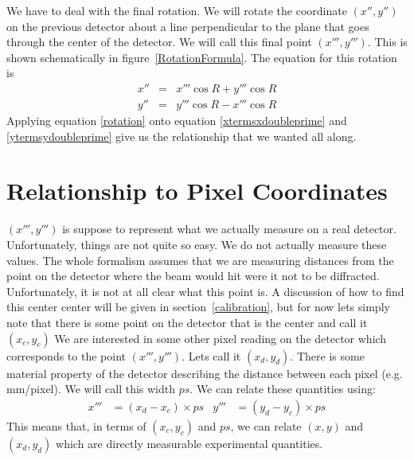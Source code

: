 \begin{SCfigure}[1][tb]
    \centering
    
    \caption{Here, we take a point on a plane rotated
    by angle $\beta$ about $\hat y$ and by angle
    $\alpha$ about $\hat x'$. We then rotated this point
    about a line normal to the plane going through the
    origin by angle $R$. Rotating the point is 
    equivalent to rotating the plane.}
    \label{RotationFormula}
\end{SCfigure}

We have to deal with the final rotation. We will
rotate the coordinate $(x'',y'')$ on the
previous detector about a line perpendicular to
the plane that goes through the center of the
detector. We will call this final
point $(x''',y''')$. This is shown schematically 
in figure~\ref{RotationFormula}. The equation for 
this rotation is
\begin{eqnarray}\label{rotation}
    x''&=&x'''\cos R + y'''\cos R\\
    y''&=&y'''\cos R - x'''\cos R
\end{eqnarray}
Applying equation \ref{rotation} onto equation 
\ref{xtermsxdoubleprime} and \ref{ytermsydoubleprime}
give us the relationship that we wanted all along.

\section{Relationship to Pixel Coordinates}

$(x''',y''')$ is suppose to represent what we actually
measure on a real detector. Unfortunately, things are
not quite so easy. We do not actually measure these
values. The whole formalism assumes that we are 
measuring distances from the point on the
detector where the beam would hit were it not to be
diffracted. Unfortunately, it is not at all clear
what this point is. A discussion of how to find
this center center will
be given in section~\ref{calibration}, but for now
lets simply note that there is some point on the detector
that is the center and call it $(x_c,y_c)$ 
We are interested in some other pixel reading
on the detector which corresponds to the point
$(x''',y''')$. Lets call it $(x_d,y_d)$. 
There is some material property of the detector 
describing the distance between each pixel
(e.g. \unit[1000]{mm/pixel}). We will call
this width $ps$. We can relate these quantities 
using:
\begin{align}\label{conversionToPixels}
    x'''&=(x_d-x_c) \times ps &
    y'''&=(y_d-y_c) \times ps
\end{align}
This means that, in terms of $(x_c,y_c)$ and $ps$,
we can relate $(x,y)$ and $(x_d,y_d)$ which are
directly measurable experimental quantities.

